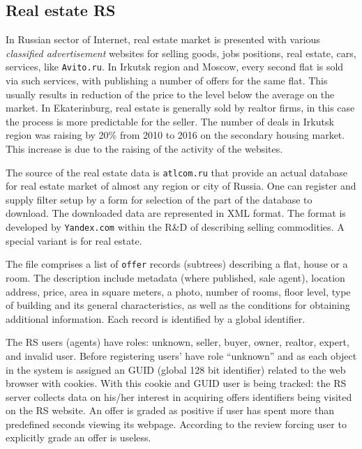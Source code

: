 \documentclass[conference,a4]{IEEEtran}
\begin{document}
\subsection{Real estate RS}

In Russian sector of Internet, real estate market is presented with various \emph{classified advertisement} websites for selling goods, jobs positions, real estate, cars, services, like \texttt{Avito.ru}.  In Irkutsk region and Moscow, every second flat is sold via such services, with publishing a number of offers for the same flat.  This usually results in reduction of the price to the level below the average on the market.  In Ekaterinburg, real estate is generally sold by realtor firms, in this case the process is more predictable for the seller.  The number of deals in Irkutsk region was raising by 20\% from 2010 to 2016 on the secondary housing market.  This increase is due to the raising of the activity of the websites.

The source of the real estate data is \texttt{atlcom.ru} that provide an actual database for real estate market of almost any region or city of Russia.  One can register and supply filter setup by a form for selection of the part of the database to download. The downloaded data are represented in XML format.  The format is developed by \texttt{Yandex.com} within the R\&D of describing selling commodities.  A special variant is for real estate.

The file comprises a list of \texttt{offer} records (subtrees) describing a flat, house or a room.  The description include metadata (where published, sale agent), location address, price, area in square meters, a photo, number of rooms, floor level, type of building and its general characteristics, as well as the conditions for obtaining additional information.  Each record is identified by a global identifier.

The RS users (agents) have roles: unknown, seller, buyer, owner, realtor, expert, and invalid user.  Before registering users' have role ``unknown'' and as each object in the system is assigned an GUID (global 128 bit identifier) related to the web browser with cookies.  With this cookie and GUID user is being tracked: the RS server collects data on his/her interest in acquiring offers identifiers being visited on the RS website.  An offer is graded as positive if user has spent more than predefined seconds viewing its webpage.  According to the review \cite{br13} forcing user to explicitly grade an offer is useless.
\end{document}
